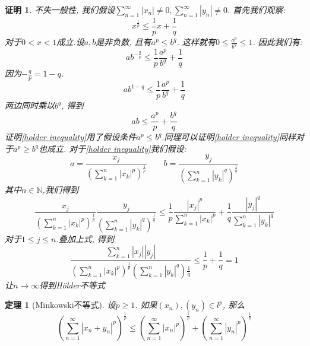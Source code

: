 \documentclass[a4paper,11pt]{article}
\theoremstyle{mystyle}
\newtheorem{theorem}{\hspace{2em}定理}[section]
\newtheorem{Proof}{\hspace{2em}证明}[section]
\begin{document}
\begin{Proof}
  不失一般性, 我们假设$\sum_{n=1}^{\infty}|x_n|\neq0,\sum_{n=1}^{\infty}|y_n|\neq0$. 首先我们观察:
  \begin{equation*}
    x^{\frac{1}{p}}\leq\frac{1}{p}x+\frac{1}{q}
  \end{equation*}
  对于$0<x<1$成立.设$a,b$是非负数, 且有$a^p\leq b^q$. 这样就有$0\leq\frac{a^p}{b^q}\leq1$. 因此我们有:
  \begin{equation*}
    ab^{-\frac{q}{p}}\leq\frac{1}{p}\frac{a^p}{b^q}+\frac{1}{q}
  \end{equation*}
  因为$-\frac{q}{p}=1-q$.
  \begin{equation*}
    ab^{1-q}\leq\frac{1}{p}\frac{a^p}{b^q}+\frac{1}{q}
  \end{equation*}
  两边同时乘以$b^q$, 得到
  \begin{equation}\label{holder inequality}
    ab\leq\frac{a^p}{p}+\frac{b^q}{q}
  \end{equation}
  证明\ref{holder inequality}用了假设条件$a^p\leq b^q$.同理可以证明\ref{holder inequality}同样对于$a^p\geq b^q$也成立. 对于\ref{holder inequality}我们假设:
  \begin{equation*}
    a=\frac{x_j}{(\sum_{k=1}^{n}|x_k|^p)^\frac{1}{p}}\quad\quad  b=\frac{y_j}{(\sum_{k=1}^{n}|y_k|^q)^\frac{1}{q}}
  \end{equation*}
  其中$n\in\mathbb{N}$,我们得到
  \begin{equation*}
    \frac{x_j}{(\sum_{k=1}^{n}|x_k|^p)^{\frac{1}{p}}}\frac{y_j}{(\sum_{k=1}^{n}|y_k|^q)^\frac{1}{q}}\leq\frac{1}{p}\frac{|x_j|^p}{\sum_{k=1}^{n}|x_k|^p}+\frac{1}{q}\frac{|y_j|^q}{\sum_{k=1}^{n}|y_k|^q}
  \end{equation*}
  对于$1\leq j\leq n$.叠加上式, 得到
  \begin{equation*}
    \frac{\sum_{k=1}^{n}|x_j||y_j|}{(\sum_{k=1}^{n}|x_k|^p)^{\frac{1}{p}}(\sum_{k=1}^{n}|y_k|^q)\frac{1}{q}}\leq\frac{1}{p}+\frac{1}{q}=1
  \end{equation*}
  让$n\rightarrow\infty$得到H\"{o}lder不等式
\end{Proof}
\begin{theorem}[Minkowski不等式]
  设$p\geq1$. 如果$(x_n),(y_n)\in l^p$, 那么
  \begin{equation*}
    (\sum_{n=1}^{\infty}|x_n+y_n|^p)^{\frac{1}{p}}\leq(\sum_{n=1}^{\infty}|x_n|^p)^\frac{1}{p}+(\sum_{n=1}^{\infty}|y_n|^p)^\frac{1}{p}
  \end{equation*}
\end{theorem}
\end{document}
